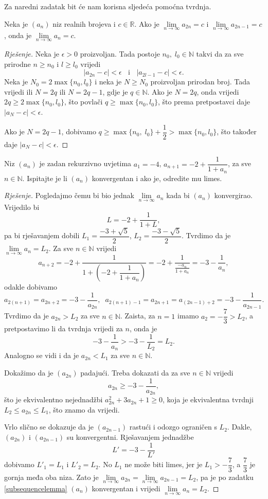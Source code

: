 Za naredni zadatak bit će nam korisna sljedeća pomoćna tvrdnja.
\begin{exercise}
\label{subsequencelemma}
Neka je $(a_n)$ niz realnih brojeva i $c\in \mathbb{R}$. Ako je $\lim\limits_{n\to \infty}{a_{2n}}=c$ i $\lim\limits_{n\to \infty}{a_{2n-1}}=c$, onda je $\lim\limits_{n\to \infty}{a_{n}}=c$.
\end{exercise}
\begin{proof}[Rješenje]
Neka je $\epsilon>0$ proizvoljan. Tada postoje $n_0,\; l_0\in \mathbb{N}$ takvi da za sve prirodne $n\geq n_0$ i $l\geq l_0$ vrijedi 
$$|a_{2n}-c|<\epsilon\;\;\text{ i }\;\;|a_{2l-1}-c|<\epsilon.$$ 
Neka je $N_0=2\max\{n_0, l_0\}$ i neka je $N\geq N_0$ proizvoljan prirodan broj. Tada vrijedi ili $N=2q$ ili $N=2q-1$, gdje je $q\in \mathbb{N}$. Ako je $N=2q$, onda vrijedi $2q\geq 2\max\{n_0, l_0\}$, što povlači $q\geq \max\{n_0, l_0\}$, što prema pretpostavci daje $|a_N-c|<\epsilon$. 

Ako je $N=2q-1$, dobivamo $q\geq \max\{n_0,\; l_0\}+\dfrac{1}{2}>\max\{n_0, l_0\}$, što također daje $|a_N-c|<\epsilon$.
\end{proof}
\begin{exercise}
\label{38}
Niz $(a_n)$ je zadan rekurzivno uvjetima $a_1=-4$, $a_{n+1}=-2+\dfrac{1}{1+a_n}$, za sve $n\in \mathbb{N}$. Ispitajte je li $(a_n)$ konvergentan i ako je, odredite mu limes.
\end{exercise}
\begin{proof}[Rješenje]
Pogledajmo čemu bi bio jednak $\lim\limits_{n\to \infty}{a_n}$ kada bi $(a_n)$ konvergirao. Vrijedilo bi
$$L=-2+\dfrac{1}{1+L},$$
pa bi rješavanjem dobili $L_1=\dfrac{-3+\sqrt{5}}{2}$, $L_2=\dfrac{-3-\sqrt{5}}{2}$. Tvrdimo da je $\lim\limits_{n\to \infty}{a_n}=L_2$.
Za sve $n\in \mathbb{N}$ vrijedi
$$a_{n+2}=-2+\dfrac{1}{1+\left(-2+\dfrac{1}{1+a_n}\right)}=-2+\dfrac{1}{\frac{-a_n}{1+a_n}}=-3-\dfrac{1}{a_n},$$
odakle dobivamo
$$a_{2(n+1)}=a_{2n+2}=-3-\dfrac{1}{a_{2n}},\;\; a_{2(n+1)-1}=a_{2n+1}=a_{(2n-1)+2}=-3-\dfrac{1}{a_{2n-1}}.$$
Tvrdimo da je $a_{2n}> L_2$ za sve $n\in \mathbb{N}$. Zaista, za $n=1$ imamo $a_2=-\dfrac{7}{3}>L_2$, a pretpostavimo li da tvrdnja vrijedi za $n$, onda je
$$-3-\dfrac{1}{a_n}>-3-\dfrac{1}{L_2}=L_2.$$
Analogno se vidi i da je $a_{2n}< L_1$ za sve $n\in \mathbb{N}$.

Dokažimo da je $(a_{2n})$ padajući. Treba dokazati da za sve $n\in \mathbb{N}$ vrijedi
$$a_{2n}\geq -3-\dfrac{1}{a_{2n}},$$
što je ekvivalentno nejednadžbi $a_{2n}^2+3a_{2n}+1\geq 0$, koja je ekvivalentna tvrdnji $L_2\leq a_{2n}\leq L_1$, što znamo da vrijedi.

Vrlo slično se dokazuje da je $(a_{2n-1})$ rastući i odozgo ograničen s $L_2$. Dakle, $(a_{2n})$ i $(a_{2n-1})$ su konvergentni. Rješavanjem jednadžbe
$$L'=-3-\dfrac{1}{L'}$$
dobivamo $L'_1=L_1$ i $L'_2=L_2$. No $L_1$ ne može biti limes, jer je $L_1>-\dfrac{7}{3}$, a $\dfrac{7}{3}$ je gornja međa oba niza. Zato je $\lim\limits_{n\to \infty}{a_{2n}}=\lim\limits_{n\to \infty}{a_{2n-1}}=L_2$, pa je po zadatku \ref{subsequencelemma} $(a_n)$ konvergentan i vrijedi $\lim\limits_{n\to \infty}{a_{n}}=L_2$.
\end{proof}
